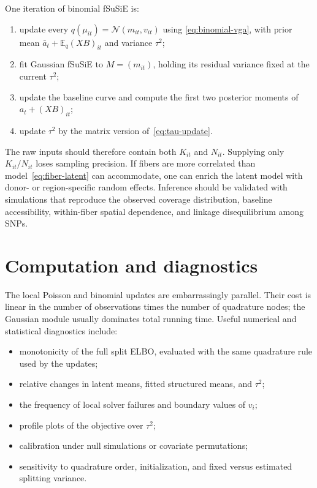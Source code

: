 \documentclass[11pt]{article}
\newcommand{\E}{\mathbb{E}}
\newcommand{\N}{\mathcal{N}}
\begin{document}
One iteration of binomial fSuSiE is:
\begin{enumerate}
\item update every $q(\mu_{it})=\N(m_{it},v_{it})$ using
\eqref{eq:binomial-vga}, with prior mean
$\bar a_t+\E_q(XB)_{it}$ and variance $\tau^2$;
\item fit Gaussian fSuSiE to $M=(m_{it})$, holding its residual variance fixed
at the current $\tau^2$;
\item update the baseline curve and compute the first two posterior moments of
$a_t+(XB)_{it}$;
\item update $\tau^2$ by the matrix version of~\eqref{eq:tau-update}.
\end{enumerate}

The raw inputs should therefore contain both $K_{it}$ and $N_{it}$. Supplying
only $K_{it}/N_{it}$ loses sampling precision. If fibers are more correlated
than model~\eqref{eq:fiber-latent} can accommodate, one can enrich the latent
model with donor- or region-specific random effects. Inference should be
validated with simulations that reproduce the observed coverage distribution,
baseline accessibility, within-fiber spatial dependence, and linkage
disequilibrium among SNPs.

\section{Computation and diagnostics}

The local Poisson and binomial updates are embarrassingly parallel. Their cost
is linear in the number of observations times the number of quadrature nodes;
the Gaussian module usually dominates total running time. Useful numerical and
statistical diagnostics include:
\begin{itemize}
\item monotonicity of the full split ELBO, evaluated with the same quadrature
rule used by the updates;
\item relative changes in latent means, fitted structured means, and
$\tau^2$;
\item the frequency of local solver failures and boundary values of $v_i$;
\item profile plots of the objective over $\tau^2$;
\item calibration under null simulations or covariate permutations;
\item sensitivity to quadrature order, initialization, and fixed versus
estimated splitting variance.
\end{itemize}
\end{document}

